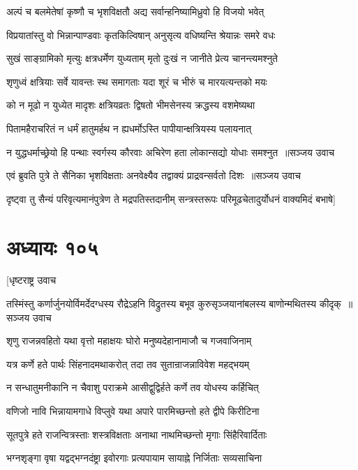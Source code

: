 \twolineshloka
{अल्पं च बलमेतेषां कृष्णौ च भृशविक्षतौ}
{अद्य सर्वान्हनिष्यामिध्रुवो हि विजयो भवेत्}


\twolineshloka
{विप्रयातांस्तु वो भिन्नान्पाण्डवाः कृतकिल्विषान्}
{अनुसृत्य वधिष्यन्ति श्रेयान्नः समरे वधः}


\twolineshloka
{सुखं साङ्ग्रामिको मृत्युः क्षत्रधर्मेण युध्यताम्}
{मृतो दुःखं न जानीते प्रेत्य चानन्त्यमश्नुते}


\twolineshloka
{शृणुध्वं क्षत्रियाः सर्वे यावन्तः स्थ समागताः}
{यदा शूरं च भीरुं च मारयत्यन्तको मयः}


\twolineshloka
{को न मूढो न युध्येत मादृशः क्षत्रियव्रतः}
{द्विषतो भीमसेनस्य क्रद्धस्य वशमेष्यथा}


\twolineshloka
{पितामहैराचरितं न धर्मं हातुमर्हथ}
{न ह्यधर्मोऽस्ति पापीयान्क्षत्रियस्य पलायनात्}


\threelineshloka
{न युद्धधर्माच्छ्रेयो हि पन्थाः स्वर्गस्य कौरवाः}
{अचिरेण हता लोकान्सद्यो योधाः समश्नुत ॥सञ्जय उवाच}
{}


\threelineshloka
{एवं ब्रुवति पुत्रे ते सैनिका भृशविक्षताः}
{अनवेक्ष्यैव तद्वाक्यं प्राद्रवन्सर्वतो दिशः ॥सञ्जय उवाच}
{}


\twolineshloka
{दृष्ट्वा तु सैन्यं परिवृत्यमानंपुत्रेण ते मद्रपतिस्तदानीम्}
{सन्त्रस्तरूपः परिमूढचेतादुर्योधनं वाक्यमिदं बभाषे]}


\chapter{अध्यायः १०५}
\twolineshloka
{[धृष्टराष्ट्र उवाच}
{}


\threelineshloka
{तस्मिंस्तु कर्णार्जुनयोर्विमर्देदग्धस्य रौद्रेऽहनि विद्रुतस्य}
{बभूव कुरुसृञ्जयानांबलस्य बाणोन्मथितस्य कीदृक् ॥सञ्जय उवाच}
{}


\twolineshloka
{शृणु राजन्नवहितो यथा वृत्तो महाक्षयः}
{घोरो मनुष्यदेहानामाजौ च गजवाजिनाम्}


\twolineshloka
{यत्र कर्णे हते पार्थः सिंहनादमथाकरोत्}
{तदा तव सुतान्राजन्नाविवेश महद्भयम्}


\twolineshloka
{न सन्धातुमनीकानि न चैवाशु पराक्रमे}
{आसीद्वुद्विर्हते कर्णे तव योधस्य कर्हिचित्}


\twolineshloka
{वणिजो नावि भिन्नायामगाधे विप्लुवे यथा}
{अपारे पारमिच्छन्तो हते द्वीपे किरीटिना}


\twolineshloka
{सूतपुत्रे हते राजन्वित्रस्ताः शस्त्रविक्षताः}
{अनाथा नाथमिच्छन्तो मृगाः सिंहैरिवार्दिताः}


\twolineshloka
{भग्नशृङ्गा वृषा यद्वद्भग्नदंष्ट्रा इवोरगाः}
{प्रत्यपायाम सायाह्ने निर्जिताः सव्यसाचिना}


